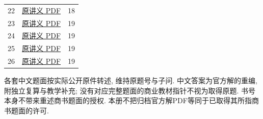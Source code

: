 \begin{longtable}{@{}p{.15\linewidth}p{.54\linewidth}p{.21\linewidth}@{}}
22 & \href{https://ocw.mit.edu/courses/8-324-relativistic-quantum-field-theory-ii-fall-2010/e3612dd1ff501a64f7fd2f9ae9f51766_MIT8_324F10_Lecture22.pdf}{原讲义 PDF} & 18 \\
23 & \href{https://ocw.mit.edu/courses/8-324-relativistic-quantum-field-theory-ii-fall-2010/68c19784d41c0823be216a2c43c38f3d_MIT8_324F10_Lecture23.pdf}{原讲义 PDF} & 19 \\
24 & \href{https://ocw.mit.edu/courses/8-324-relativistic-quantum-field-theory-ii-fall-2010/d25d71d30b44a5fe4f53d6de7ce8d3d3_MIT8_324F10_Lecture24.pdf}{原讲义 PDF} & 19 \\
25 & \href{https://ocw.mit.edu/courses/8-324-relativistic-quantum-field-theory-ii-fall-2010/e92a3b04d344bd166fb5abbba7bcbe4f_MIT8_324F10_Lecture25.pdf}{原讲义 PDF} & 19 \\
26 & \href{https://ocw.mit.edu/courses/8-324-relativistic-quantum-field-theory-ii-fall-2010/a962039dd43de1677160d107c7dd8e5a_MIT8_324F10_Lecture26.pdf}{原讲义 PDF} & 19 \\
\bottomrule
\end{longtable}
各套中文题面按实际公开原件转述, 维持原题号与子问. 中文答案为官方解的重编, 附独立复算与教学补充; 没有对应完整题面的商业教材指针不视为取得原题. 书号本身不带来重述商书题面的授权. 本册不把归档官方解PDF等同于已取得其所指商书题面的许可.
